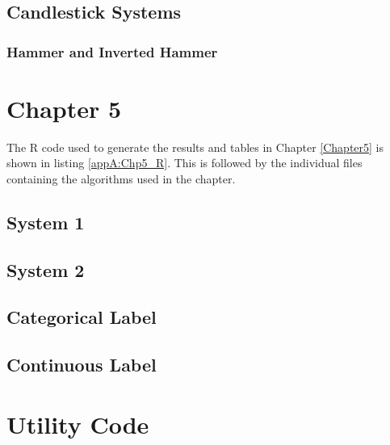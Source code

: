 
\label{appA:bout_Quant90}

\subsection{Candlestick Systems}
\subsubsection{Hammer and Inverted Hammer}

\label{appA:Hammer}


\label{appA:Hammer_aroon}


\label{appA:Engulf}


\label{appA:Engulf_aroon}


\label{appA:Doji_aroon}

\section{Chapter 5}
The R code used to generate the results and tables in Chapter \ref{Chapter5} is shown in listing \ref{appA:Chp5_R}. This is followed by the individual files containing the algorithms used in the chapter.


\label{appA:Chp5_R}

\subsection{System 1}

\label{appA:ts_1}

\subsection{System 2}

\label{appA:ts_2}

\subsection{Categorical Label}

\label{appA:ts_4}

\subsection{Continuous Label}

\label{appA:ts_3}

\section{Utility Code}
\label{appA:utility}

